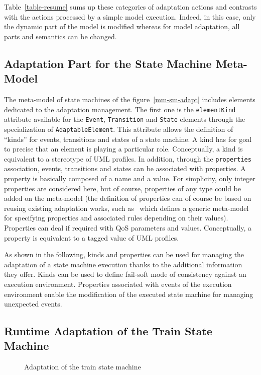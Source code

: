 \documentclass[english, 10pt]{llncs}
\begin{document}
Table~\ref{table-resume} sums up these categories of adaptation
actions and contrasts with the actions processed by a simple model
execution. Indeed, in this case, only the dynamic part of the model is
modified whereas for model adaptation, all parts and semantics can be
changed.

\subsection{Adaptation Part for the State Machine Meta-Model}

The meta-model of state machines of the figure~\ref{mm-sm-adapt}
includes elements dedicated to the adaptation management. The first
one is the \texttt{elementKind} attribute available for the
\texttt{Event}, \texttt{Transition} and \texttt{State} elements
through the specialization of \texttt{AdaptableElement}. This
attribute allows the definition of ``kinds'' for events, transitions
and states of a state machine. A kind has for goal to precise that an
element is playing a particular role. Conceptually, a kind is
equivalent to a stereotype of UML profiles. In addition, through the
\texttt{properties} association, events, transitions and states can be
associated with properties. A property is basically composed of a name
and a value. For simplicity, only integer properties are considered
here, but of course, properties of any type could be added on the
meta-model (the definition of properties can of course be based on
reusing existing adaptation works, such as~\cite{fleurey09} which
defines a generic meta-model for specifying properties and associated
rules depending on their values). Properties can deal if required with
QoS parameters and values. Conceptually, a property is equivalent to a
tagged value of UML profiles.

As shown in the following, kinds and properties can be used for
managing the adaptation of a state machine execution thanks to the
additional information they offer. Kinds can be used to define
fail-soft mode of consistency against an execution
environment. Properties associated with events of the execution
environment enable the modification of the executed state machine for
managing unexpected events.

\subsection{Runtime Adaptation of the Train State Machine}

\begin{figure}[htbp]
\begin{center}
\caption{Adaptation of the train state machine}
\label{train-adapt}
\end{center}
\end{figure}
\end{document}
